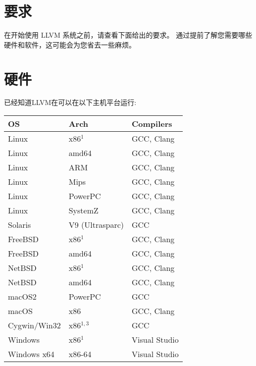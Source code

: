 \section{要求 }
\par{在开始使用 LLVM 系统之前，请查看下面给出的要求。 通过提前了解您需要哪些硬件和软件，这可能会为您省去一些麻烦。} 
\section{硬件 }
\par{已经知道LLVM在可以在以下主机平台运行:} 


\begin{tabular}{l l l}
	\textbf{OS} & \textbf{Arch} & \textbf{Compilers} \\
\hline
	Linux 		&	x86$^{1}$	& GCC, Clang    \\  \hline  
	Linux 		&	amd64		& GCC, Clang 	\\  \hline
	Linux 		& 	ARM		& GCC, Clang    \\  \hline
	Linux 		&	Mips		& GCC, Clang	\\  \hline	
	Linux 		&	PowerPC		& GCC, Clang	\\  \hline
	Linux		&	SystemZ		& GCC, Clang	\\  \hline
	Solaris		&	V9 (Ultrasparc)	& GCC		\\  \hline
	FreeBSD		&	x86$^{1}$	& GCC, Clang	\\  \hline
	FreeBSD		&	amd64		& GCC, Clang	\\  \hline
	NetBSD		&	x86$^{1}$	& GCC, Clang	\\  \hline
	NetBSD		&	amd64		& GCC, Clang	\\  \hline
	macOS2		&	PowerPC		& GCC		\\  \hline
	macOS		&	x86		& GCC, Clang	\\  \hline
	Cygwin/Win32	&	x86$^{1,3}$	& GCC		\\  \hline
	Windows		&	x86$^{1}$	& Visual Studio	\\  \hline
	Windows x64 	& 	x86-64		& Visual Studio	\\  \hline
\end{tabular}


